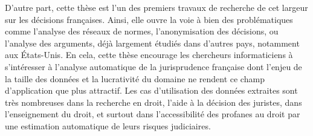D'autre part, cette thèse est l'un des premiers travaux de recherche de cet largeur sur les décisions françaises. Ainsi, elle ouvre la voie à bien des problématiques comme l'analyse des réseaux de normes, l'anonymisation des décisions, ou l'analyse des arguments, déjà largement étudiés dans d'autres pays, notamment aux États-Unis. En cela, cette thèse encourage les chercheurs informaticiens à s'intéresser à l'analyse automatique de la jurisprudence française dont l'enjeu de la taille des données et la lucrativité du domaine ne rendent ce champ d'application que plus attractif. Les cas d'utilisation des données extraites sont très nombreuses dans la recherche en droit, l'aide à la décision des juristes, dans l'enseignement du droit, et surtout dans l'accessibilité des profanes au droit par une estimation automatique de leurs risques judiciaires.
